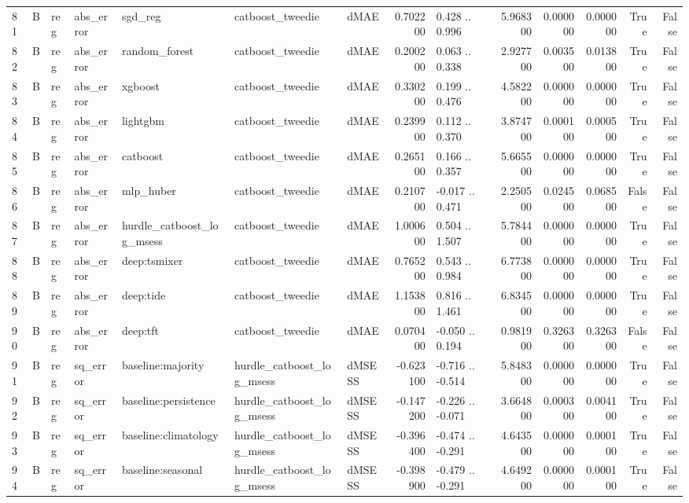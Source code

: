 \begin{table}
\begin{tabular}{lllllllrlrrrrr}
81 & B & reg & abs\_error & sgd\_reg & catboost\_tweedie & dMAE & 0.702200 & 0.428 .. 0.996 & 5.968300 & 0.000000 & 0.000000 & True & False \\
82 & B & reg & abs\_error & random\_forest & catboost\_tweedie & dMAE & 0.200200 & 0.063 .. 0.338 & 2.927700 & 0.003500 & 0.013800 & True & False \\
83 & B & reg & abs\_error & xgboost & catboost\_tweedie & dMAE & 0.330200 & 0.199 .. 0.476 & 4.582200 & 0.000000 & 0.000000 & True & False \\
84 & B & reg & abs\_error & lightgbm & catboost\_tweedie & dMAE & 0.239900 & 0.112 .. 0.370 & 3.874700 & 0.000100 & 0.000500 & True & False \\
85 & B & reg & abs\_error & catboost & catboost\_tweedie & dMAE & 0.265100 & 0.166 .. 0.357 & 5.665500 & 0.000000 & 0.000000 & True & False \\
86 & B & reg & abs\_error & mlp\_huber & catboost\_tweedie & dMAE & 0.210700 & -0.017 .. 0.471 & 2.250500 & 0.024500 & 0.068500 & False & False \\
87 & B & reg & abs\_error & hurdle\_catboost\_log\_msess & catboost\_tweedie & dMAE & 1.000600 & 0.504 .. 1.507 & 5.784400 & 0.000000 & 0.000000 & True & False \\
88 & B & reg & abs\_error & deep:tsmixer & catboost\_tweedie & dMAE & 0.765200 & 0.543 .. 0.984 & 6.773800 & 0.000000 & 0.000000 & True & False \\
89 & B & reg & abs\_error & deep:tide & catboost\_tweedie & dMAE & 1.153800 & 0.816 .. 1.461 & 6.834500 & 0.000000 & 0.000000 & True & False \\
90 & B & reg & abs\_error & deep:tft & catboost\_tweedie & dMAE & 0.070400 & -0.050 .. 0.194 & 0.981900 & 0.326300 & 0.326300 & False & False \\
91 & B & reg & sq\_error & baseline:majority & hurdle\_catboost\_log\_msess & dMSESS & -0.623100 & -0.716 .. -0.514 & 5.848300 & 0.000000 & 0.000000 & True & False \\
92 & B & reg & sq\_error & baseline:persistence & hurdle\_catboost\_log\_msess & dMSESS & -0.147200 & -0.226 .. -0.071 & 3.664800 & 0.000300 & 0.004100 & True & False \\
93 & B & reg & sq\_error & baseline:climatology & hurdle\_catboost\_log\_msess & dMSESS & -0.396400 & -0.474 .. -0.291 & 4.643500 & 0.000000 & 0.000100 & True & False \\
94 & B & reg & sq\_error & baseline:seasonal & hurdle\_catboost\_log\_msess & dMSESS & -0.398900 & -0.479 .. -0.291 & 4.649200 & 0.000000 & 0.000100 & True & False \\

\end{tabular}
\end{table}
